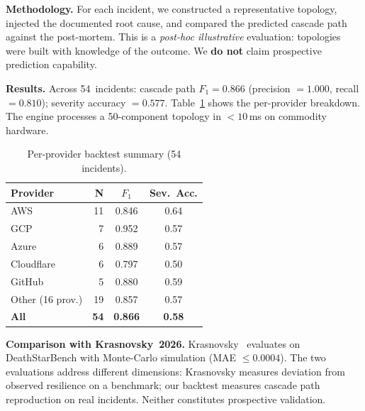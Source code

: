 \documentclass[conference,10pt]{IEEEtran}
\begin{document}
\textbf{Methodology.} For each incident, we constructed a
representative topology, injected the documented root cause, and
compared the predicted cascade path against the post-mortem.
This is a \emph{post-hoc illustrative} evaluation: topologies were
built with knowledge of the outcome. We \textbf{do not} claim
prospective prediction capability.

\textbf{Results.} Across 54~incidents: cascade path
$F_1 = 0.866$ (precision $= 1.000$, recall $= 0.810$);
severity accuracy $= 0.577$. Table~\ref{tab:provider} shows the
per-provider breakdown.
The engine processes a 50-component topology in ${<}10$\,ms on
commodity hardware.

\begin{table}[t]
\centering
\caption{Per-provider backtest summary (54 incidents).}
\label{tab:provider}
\footnotesize
\begin{tabular}{@{}lrcc@{}}
\toprule
\textbf{Provider} & \textbf{N} & \textbf{$F_1$} & \textbf{Sev.\ Acc.} \\
\midrule
AWS               & 11 & 0.846 & 0.64 \\
GCP               &  7 & 0.952 & 0.57 \\
Azure             &  6 & 0.889 & 0.57 \\
Cloudflare        &  6 & 0.797 & 0.50 \\
GitHub            &  5 & 0.880 & 0.59 \\
Other (16 prov.)  & 19 & 0.857 & 0.57 \\
\midrule
\textbf{All}      & \textbf{54} & \textbf{0.866} & \textbf{0.58} \\
\bottomrule
\end{tabular}
\end{table}

\textbf{Comparison with Krasnovsky~2026.}
Krasnovsky~\cite{krasnovsky2026} evaluates on DeathStarBench with
Monte-Carlo simulation (MAE $\le 0.0004$). The two evaluations
address different dimensions: Krasnovsky measures deviation from
observed resilience on a benchmark; our backtest measures cascade
path reproduction on real incidents. Neither constitutes prospective
validation.
\end{document}
